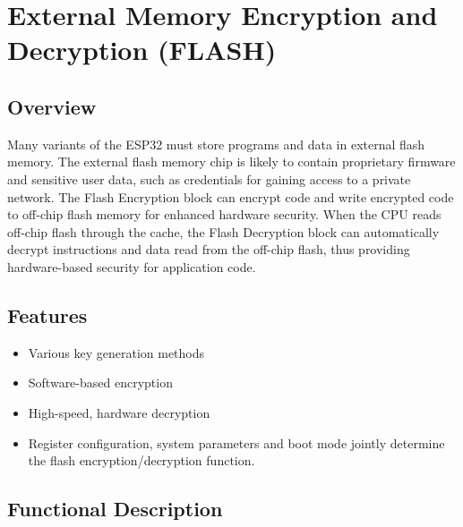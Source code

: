 \documentclass[main\_\_EN.tex]{subfiles}
\begin{document}
\setenglishformatting

\ifglobal
\else
    \listoftodos
    {\let\clearpage\relax \listofdonetodos}
    \tableofcontents
\fi



\hypertarget{extmemencr}{}
\chapter{External Memory Encryption and Decryption (FLASH)}
\label{mod:extmemencr}


\section{Overview}

Many variants of the ESP32 must store programs and data in external flash memory. The external flash memory chip is likely to contain proprietary firmware and sensitive user data, such as credentials for gaining access to a private network.
The Flash Encryption block can encrypt code and write encrypted code to off-chip flash memory for enhanced hardware security. When the CPU reads off-chip flash through the cache, the
Flash Decryption block can automatically decrypt instructions and data read from the off-chip flash, thus providing hardware-based security for application code.

\section{Features}

\begin{itemize}
    \item Various key generation methods
    \item Software-based encryption
    \item High-speed, hardware decryption
    \item Register configuration, system parameters and boot mode jointly determine the flash encryption/decryption function.
\end{itemize}


\section{Functional Description}
\end{document}
